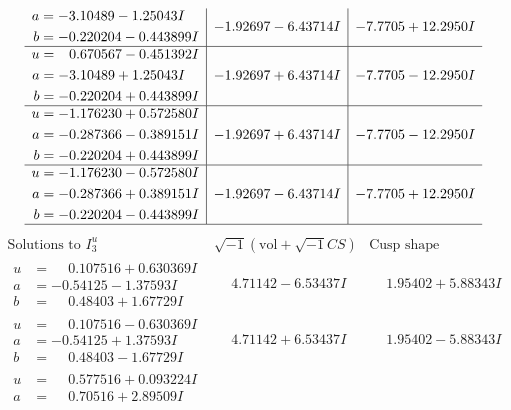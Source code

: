 \documentclass[1p]{elsarticle_modified}
\theoremstyle{definition}
\newcommand{\I}{\sqrt{-1}}
\begin{document}
$$\begin{array}{c|c|c}
\begin{aligned}
a &= -3.10489 - 1.25043 I \\
b &= -0.220204 - 0.443899 I\end{aligned}
 & -1.92697 - 6.43714 I & -7.7705 + 12.2950 I \\ \hline\begin{aligned}
u &= \phantom{-}0.670567 - 0.451392 I \\
a &= -3.10489 + 1.25043 I \\
b &= -0.220204 + 0.443899 I\end{aligned}
 & -1.92697 + 6.43714 I & -7.7705 - 12.2950 I \\ \hline\begin{aligned}
u &= -1.176230 + 0.572580 I \\
a &= -0.287366 - 0.389151 I \\
b &= -0.220204 + 0.443899 I\end{aligned}
 & -1.92697 + 6.43714 I & -7.7705 - 12.2950 I \\ \hline\begin{aligned}
u &= -1.176230 - 0.572580 I \\
a &= -0.287366 + 0.389151 I \\
b &= -0.220204 - 0.443899 I\end{aligned}
 & -1.92697 - 6.43714 I & -7.7705 + 12.2950 I\\
 \hline 
 \end{array}$$\newpage$$\begin{array}{c|c|c}  
\text{Solutions to }I^u_{3}& \I (\text{vol} + \sqrt{-1}CS) & \text{Cusp shape}\\
 \hline 
\begin{aligned}
u &= \phantom{-}0.107516 + 0.630369 I \\
a &= -0.54125 - 1.37593 I \\
b &= \phantom{-}0.48403 + 1.67729 I\end{aligned}
 & \phantom{-}4.71142 - 6.53437 I & \phantom{-}1.95402 + 5.88343 I \\ \hline\begin{aligned}
u &= \phantom{-}0.107516 - 0.630369 I \\
a &= -0.54125 + 1.37593 I \\
b &= \phantom{-}0.48403 - 1.67729 I\end{aligned}
 & \phantom{-}4.71142 + 6.53437 I & \phantom{-}1.95402 - 5.88343 I \\ \hline\begin{aligned}
u &= \phantom{-}0.577516 + 0.093224 I \\
a &= \phantom{-}0.70516 + 2.89509 I \\

\end{aligned}
\end{array}$$
\end{document}
